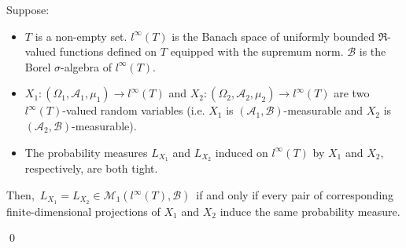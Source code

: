 \begin{lemma}
\label{FiniteDimensionalProjectionsDetermineTightLaws}
\mbox{}\vskip 0.1cm
\noindent
Suppose:
\begin{itemize}
\item
	$T$ is a non-empty set.
	$l^{\infty}(T)$ is the Banach space of uniformly bounded $\Re$-valued functions defined on $T$
	equipped with the supremum norm.
	$\mathcal{B}$ is the Borel $\sigma$-algebra of $l^{\infty}(T)$.
\item
	$X_{1} : (\Omega_{1},\mathcal{A}_{1},\mu_{1}) \longrightarrow l^{\infty}(T)$
	and
	$X_{2} : (\Omega_{2},\mathcal{A}_{2},\mu_{2}) \longrightarrow l^{\infty}(T)$
	are two $l^{\infty}(T)$-valued random variables
	(i.e. $X_{1}$ is $(\mathcal{A}_{1},\mathcal{B})$-measurable and
	$X_{2}$ is $(\mathcal{A}_{2},\mathcal{B})$-measurable).
\item
	The probability measures $L_{X_{1}}$ and $L_{X_{2}}$ induced on $l^{\infty}(T)$
	by $X_{1}$ and $X_{2}$, respectively, are both {\color{red}tight}.
\end{itemize}
Then,
\,$L_{X_{1}} = L_{X_{2}} \in \mathcal{M}_{1}(l^{\infty}(T),\mathcal{B})$\,
if and only if
every pair of corresponding finite-dimensional projections of $X_{1}$ and $X_{2}$
induce the same probability measure.
\end{lemma}
\proof
\qed


